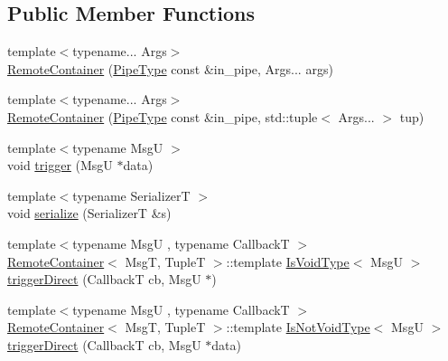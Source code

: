 \subsection*{Public Member Functions}
\begin{DoxyCompactItemize}
\item 
{\footnotesize template$<$typename... Args$>$ }\\\hyperlink{structvt_1_1pipe_1_1interface_1_1_remote_container_a5bb09812f8bb6778051d9cc6b4662dc5}{Remote\+Container} (\hyperlink{namespacevt_ac9852acda74d1896f48f406cd72c7bd3}{Pipe\+Type} const \&in\+\_\+pipe, Args... args)
\item 
{\footnotesize template$<$typename... Args$>$ }\\\hyperlink{structvt_1_1pipe_1_1interface_1_1_remote_container_afcd73686512c7d7d25beeb8a9f9d1c73}{Remote\+Container} (\hyperlink{namespacevt_ac9852acda74d1896f48f406cd72c7bd3}{Pipe\+Type} const \&in\+\_\+pipe, std\+::tuple$<$ Args... $>$ tup)
\item 
{\footnotesize template$<$typename MsgU $>$ }\\void \hyperlink{structvt_1_1pipe_1_1interface_1_1_remote_container_a1c52032c6536ca384aa0769846b01424}{trigger} (MsgU $\ast$data)
\item 
{\footnotesize template$<$typename SerializerT $>$ }\\void \hyperlink{structvt_1_1pipe_1_1interface_1_1_remote_container_ad272af02305b8a050f8e393dd551538b}{serialize} (SerializerT \&s)
\item 
{\footnotesize template$<$typename MsgU , typename CallbackT $>$ }\\\hyperlink{structvt_1_1pipe_1_1interface_1_1_remote_container}{Remote\+Container}$<$ MsgT, TupleT $>$\+::template \hyperlink{structvt_1_1pipe_1_1interface_1_1_remote_container_a0cf5387a6b1db885a7a224bab60ce16d}{Is\+Void\+Type}$<$ MsgU $>$ \hyperlink{structvt_1_1pipe_1_1interface_1_1_remote_container_ac109c549822ea32fe268e09d37e21822}{trigger\+Direct} (CallbackT cb, MsgU $\ast$)
\item 
{\footnotesize template$<$typename MsgU , typename CallbackT $>$ }\\\hyperlink{structvt_1_1pipe_1_1interface_1_1_remote_container}{Remote\+Container}$<$ MsgT, TupleT $>$\+::template \hyperlink{structvt_1_1pipe_1_1interface_1_1_remote_container_a1dc69f6cfa1318c856a412940e3dbb50}{Is\+Not\+Void\+Type}$<$ MsgU $>$ \hyperlink{structvt_1_1pipe_1_1interface_1_1_remote_container_a50eb531253f7ef5a31fcf43861c4b39a}{trigger\+Direct} (CallbackT cb, MsgU $\ast$data)
\end{DoxyCompactItemize}
